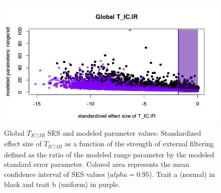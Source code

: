 \documentclass[12pt]{article}\usepackage[]{graphicx}\usepackage[]{color}
\makeatletter
\def\maxwidth{ %
  \ifdim\Gin@nat@width>\linewidth
    \linewidth
  \else
    \Gin@nat@width
  \fi
}
\newenvironment{knitrout}{}{} %
\makeatother
\begin{document}
\begin{knitrout}
\begin{figure}
{\centering \includegraphics[width=\maxwidth]{figure/External_filter_Results_plots_modeled_param1-1} 

}

\caption[Global $T_{IC/IR}$ SES and modeled parameter values]{Global $T_{IC/IR}$ SES and modeled parameter values: Standardized effect size of $T_{IC/IR}$ as a function of the strength of external filtering defined as the ratio of the modeled range parameter by the modeled standard error parameter. Colored area represents the mean confidence interval of SES values ($alpha = 0.95$). Trait a (normal) in black and trait b (uniform) in purple.}\label{fig:External_filter_Results_plots_modeled_param1}
\end{figure}


\end{knitrout}
\end{document}
